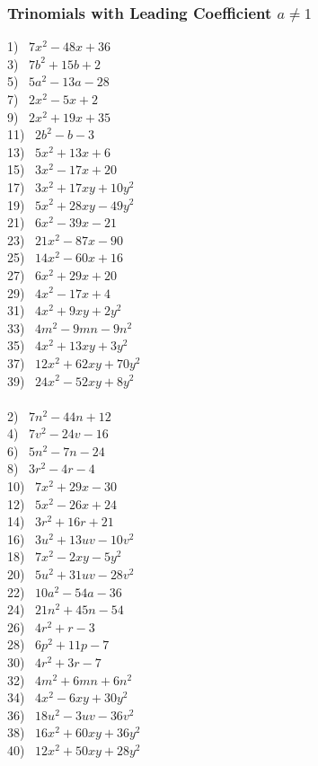 \newpage

\subsubsection{Trinomials with Leading Coefficient $a\neq 1$}

{}
\label{aisnot1}
\begin{multicols}{2}
  1)~ $7 x^2 - 48 x + 36$\\
  3)~ $7 b^2 + 15 b + 2$\\
  5)~ $5 a^2 - 13 a - 28$\\
  7)~ $2 x^2 - 5 x + 2$\\
  9)~ $2 x^2 + 19 x + 35$\\
  11)~ $2 b^2 - b - 3$\\
  13)~ $5 x^2 + 13 x + 6$\\
  15)~ $3 x^2 - 17 x + 20$\\
  17)~ $3 x^2 + 17 x y + 10 y^2$\\
  19)~ $5 x^2 + 28 x y - 49 y^2$\\
  21)~ $6 x^2 - 39 x - 21$\\
  23)~ $21 x^2 - 87 x - 90$\\
  25)~ $14 x^2 - 60 x + 16$\\
  27)~ $6 x^2 + 29 x + 20$\\
  29)~ $4 x^2 - 17 x + 4$\\
  31)~ $4 x^2 + 9 x y + 2 y^2$\\
  33)~ $4 m^2 - 9 m n - 9 n^2$\\
  35)~ $4 x^2 + 13 x y + 3 y^2$\\
  37)~ $12 x^2 + 62 x y + 70 y^2$\\
  39)~ $24 x^2 - 52 x y + 8 y^2$\\
~\\
  2)~ $7 n^2 - 44 n + 12$\\
  4)~ $7 v^2 - 24 v - 16$\\
  6)~ $5 n^2 - 7 n - 24$\\
  8)~ $3 r^2 - 4 r - 4$\\
  10)~ $7 x^2 + 29 x - 30$\\
  12)~ $5 x^2 - 26 x + 24$\\
  14)~ $3 r^2 + 16 r + 21$\\
  16)~ $3 u^2 + 13 u v - 10 v^2$\\
  18)~ $7 x^2 - 2 x y - 5 y^2$\\
  20)~ $5 u^2 + 31 u v - 28 v^2$\\
  22)~ $10 a^2 - 54 a - 36$\\
  24)~ $21 n^2 + 45 n - 54$\\
  26)~ $4 r^2 + r - 3$\\
  28)~ $6 p^2 + 11 p - 7$\\
  30)~ $4 r^2 + 3 r - 7$\\
  32)~ $4 m^2 + 6 m n + 6 n^2$\\
  34)~ $4 x^2 - 6 x y + 30 y^2$\\
  36)~ $18 u^2 - 3 u v - 36 v^2$\\
  38)~ $16 x^2 + 60 x y + 36 y^2$\\
  40)~ $12 x^2 + 50 x y + 28 y^2$\\
\end{multicols}

